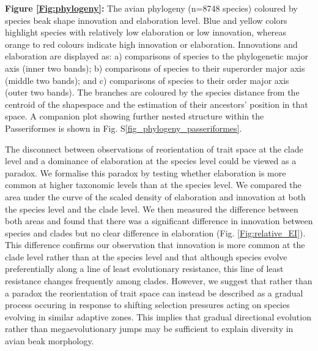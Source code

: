 \documentclass[12pt,letterpaper]{article}
\begin{document}
\bigskip

\noindent \textbf{Figure \ref{Fig:phylogeny}:} The avian phylogeny (n=8748 species) coloured by species beak shape innovation and elaboration level.
Blue and yellow colors highlight species with relatively low elaboration or low innovation, whereas orange to red colours indicate high innovation or elaboration.
Innovations and elaboration are displayed as: a) comparisons of species to the phylogenetic major axis (inner two bands); b) comparisons of species to their superorder major axis (middle two bands); and c) comparisons of species to their order major axis (outer two bands).
The branches are coloured by the species distance from the centroid of the shapespace and the estimation of their ancestors' position in that space.
A companion plot showing further nested structure within the Passeriformes is shown in Fig. S\ref{fig_phylogeny_passeriformes}.

\bigskip

The disconnect between observations of reorientation of trait space at the clade level and a dominance of elaboration at the species level could be viewed as a paradox.
We formalise this paradox by testing whether elaboration is more common at higher taxonomic levels than at the species level.
We compared the area under the curve of the scaled density of elaboration and innovation at both the species level and the clade level.
We then measured the difference between both areas and found that there was a significant difference in innovation between species and clades but no clear difference in elaboration (Fig. \ref{Fig:relative_EI}).
This difference confirms our observation that innovation is more common at the clade level rather than at the species level and that although species evolve preferentially along a line of least evolutionary resistance, this line of least resistance changes frequently among clades.
However, we suggest that rather than a paradox the reorientation of trait space can instead be described as a gradual process occuring in response to shifting selection pressures acting on species evolving in similar adaptive zones.
This implies that gradual directional evolution \cite{pagel2022general} rather than megaevolutionary jumps \cite{cooney2017mega,venditti2011multiple} may be sufficient to explain diversity in avian beak morphology.
\end{document}
